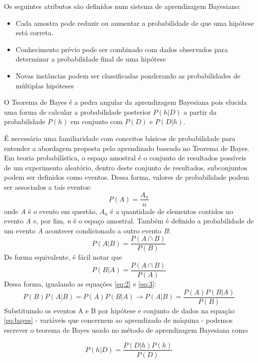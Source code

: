 Os seguintes atributos são definidos num sistema de aprendizagem Bayesiano\cite{Mitchell}: \par
\begin{itemize}
    \item Cada amostra pode reduzir ou aumentar a probabilidade de que uma hipótese está correta. 
    \item Conhecimento prévio pode ser combinado com dados observados para determinar a probabilidade final de uma hipótese
    \item Novas instâncias podem ser classificadas ponderando as probabilidades de múltiplas hipóteses
\end{itemize}
O Teorema de Bayes é a pedra angular da aprendizagem Bayesiana pois elucida uma forma de calcular a probabilidade posterior $P(h|D)$ a partir da probabilidade $P(h)$ em conjunto com $P(D)$ e $P(D|h)$\cite{Mitchell}. \par

É necessário uma familiaridade com conceitos básicos de probabilidade para entender a abordagem proposta pelo aprendizado baseado no Teorema de Bayes. Em teoria probabilística, o espaço amostral é o conjunto de resultados possíveis de um experimento aleatório, dentro deste conjunto de resultados, subconjuntos podem ser definidos como eventos. Dessa forma, valores de probabilidade podem ser associados a taís eventos:
\begin{equation}
    P(A) = \frac{A_n}{n}
\end{equation}
onde \textit{A} é o evento em questão, $A_n$ é a quantidade de elementos contidos no evento \textit{A} e, por fim, \textit{n} é o espaço amostral. Também é definido a probabilidade de um evento \textit{A} acontecer condicionado a outro evento \textit{B}:
\begin{equation}
    P(A|B) = \frac{P(A \cap B)}{P(B)} 
    \label{eq:2}
\end{equation}
De forma equivalente, é fácil notar que
\begin{equation}
    P(B|A) = \frac{P(A \cap B)}{P(A)}
    \label{eq:3}
\end{equation}
Dessa forma, igualando as equações \ref{eq:2} e \ref{eq:3}:
\begin{equation}
    P(B)P(A|B) = P(A)P(B|A) \to P(A|B) = \frac{P(A)P(B|A)}{P(B)}
    \label{eq:bayes}
\end{equation}
Substituindo os eventos A e B por hipótese e conjunto de dados na equação \ref{eq:bayes} - variáveis que concernem ao aprendizado de máquina - podemos escrever o teorema de Bayes usado no método de aprendizagem Bayesiana como \cite{Shalev-Shwartz:2014:UML:2621980} \par
\begin{equation}
    P(h|D) = \frac{P(D|h)P(h)}{P(D)}
\end{equation}

